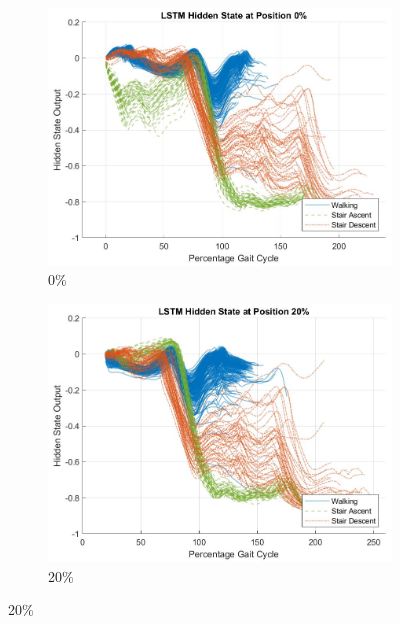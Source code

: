 \documentclass[sensors,article,submit,moreauthors,pdftex]{Definitions/mdpi}
\begin{document}
\begin{figure}[!hbt]
     \centering
     \begin{subfigure}[b]{0.32\textwidth}
         \centering
         \includegraphics[width=\textwidth]{Figures/results/hidden_state/accel_x_w_v_sa-sd/0_Participant_04.jpg}
         \caption{0\%}
         \label{subfig:a}
     \end{subfigure}
     \hfill
     \begin{subfigure}[b]{0.32\textwidth}
         \centering
         \includegraphics[width=\textwidth]{Figures/results/hidden_state/accel_x_w_v_sa-sd/20_Participant_04.jpg}
         \caption{20\%}
         \label{subfig:b}
     \end{subfigure}

\end{figure}
\end{document}
